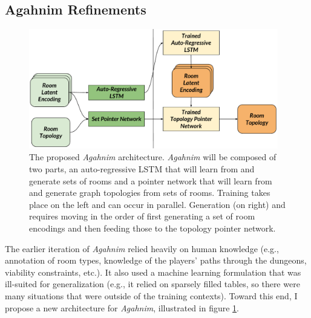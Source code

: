 \documentclass[12pt]{report}
\begin{document}
\subsection*{Agahnim Refinements}

\begin{figure}[ht]
\centering
    \includegraphics[width=0.97\textwidth]{figures/Agahnim_Architecture.pdf} 
   
    \caption{The proposed \textit{Agahnim} architecture.  \textit{Agahnim} will be composed of two parts, an auto-regressive LSTM that will learn from and generate sets of rooms and a pointer network that will learn from and generate graph topologies from sets of rooms. Training takes place on the left and can occur in parallel.  Generation (on right) and requires moving in the order of first generating a set of room encodings and then feeding those to the topology pointer network.}
  \label{fig:agahnim}
  \end{figure}


The earlier iteration of \textit{Agahnim} relied heavily on human knowledge (e.g., annotation of room types, knowledge of the players' paths through the dungeons, viability constraints, etc.).  It also used a machine learning formulation that was ill-suited for generalization (e.g., it relied on sparsely filled tables, so there were many situations that were outside of the training contexts).  Toward this end, I propose a new architecture for \textit{Agahnim}, illustrated in figure \ref{fig:agahnim}.
\end{document}
